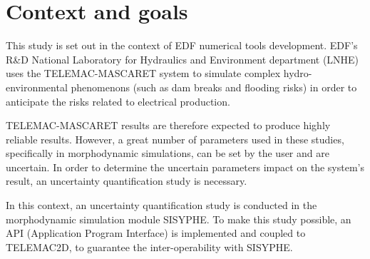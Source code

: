 \section{Context and goals}
\label{section:context}
This study is set out in the context of EDF numerical tools development. EDF's R\&D National Laboratory for Hydraulics and Environment department (LNHE) uses the TELEMAC-MASCARET system to simulate complex hydro-environmental phenomenons (such as dam breaks and flooding risks) in order to anticipate the risks related to electrical production. 

TELEMAC-MASCARET results are therefore expected to produce highly reliable results. However, a great number of parameters used in these studies, specifically in morphodynamic simulations, can be set by the user and are uncertain. In order to determine the uncertain parameters impact on the system's result, an uncertainty quantification study is necessary.

In this context, an uncertainty quantification study is conducted in the morphodynamic simulation module SISYPHE. To make this study possible, an API (Application Program Interface) is implemented and coupled to TELEMAC2D, to guarantee the inter-operability with SISYPHE.
